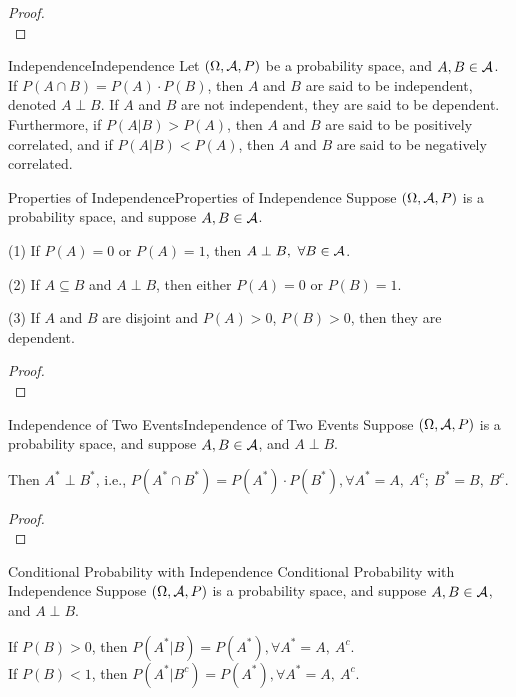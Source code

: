 \documentclass{elegantbook}
\begin{document}
\begin{proof}
\\[4cm]\vspace{0.01cm}
\end{proof}

\begin{definition}{Independence}{Independence}
Let $(\Omega,\mathcal{A}, P)$ be a probability space, and $A,B\in\mathcal{A}$. 
If $P(A\cap B)=P(A)\cdot P(B)$, then $A$ and $B$ are said to be independent, denoted $A\perp B$. If $A$ and $B$ are not independent, they are said to be dependent. 
Furthermore, if $P(A|B)>P(A)$, then $A$ and $B$ are said to be positively correlated, and if $P(A|B)<P(A)$, then $A$ and $B$ are said to be negatively correlated.
\end{definition}

\begin{theorem}{Properties of Independence}{Properties of Independence}
Suppose $(\Omega,\mathcal{A}, P)$ is a probability space, and suppose  $A,B\in\mathcal{A}$.

(1) If $P(A)=0$ or $P(A)=1$, then $A\perp B,\ \forall B\in\mathcal{A}$.

(2) If $A\subseteq B$ and $A\perp B$, then either $P(A)=0$ or $P(B)=1$.

(3) If $A$ and $B$ are disjoint and $P(A)>0$, $P(B)>0$, then they are dependent.

\end{theorem}

\begin{proof}
\\[4cm]\vspace{0.01cm}
\end{proof}

\begin{theorem}{Independence of Two Events}{Independence of Two Events}
Suppose $(\Omega,\mathcal{A}, P)$ is a probability space, and suppose $A,B\in\mathcal{A}$, and $A\perp B$.

Then $A^*\perp B^*$, i.e., $P(A^*\cap B^* )=P(A^* )\cdot P(B^* ),\forall  A^*=A,\ A^c;\ B^*=B,\ B^c$. 
\end{theorem}

\begin{proof}
\\[4cm]\vspace{0.01cm}
\end{proof}

\begin{corollary}{Conditional Probability with Independence }{Conditional Probability with Independence }
Suppose $(\Omega,\mathcal{A}, P)$ is a probability space, and suppose $A,B\in\mathcal{A}$, and $A\perp B$.

If $P(B)>0$, then $P(A^*|B)=P(A^* ),\forall A^*=A,\ A^c$.\\
If $P(B)<1$, then $P(A^*|B^c )=P(A^* ),\forall A^*=A,\ A^c$.

\end{corollary}
\end{document}
